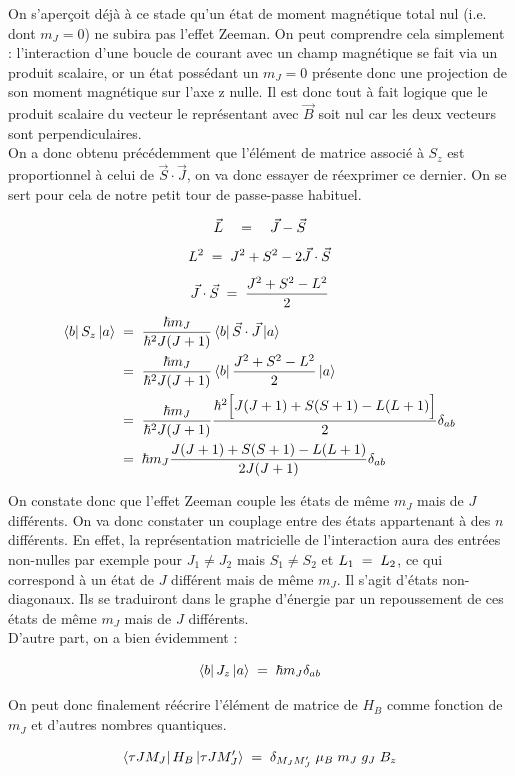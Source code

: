 On s'aperçoit déjà à ce stade qu'un état de moment magnétique total nul (i.e. dont $m_J = 0$) ne subira pas l'effet Zeeman. On peut comprendre cela simplement : l'interaction d'une boucle de courant avec un champ magnétique se fait via un produit scalaire, or un état possédant un  $m_J = 0$ présente donc une projection de son moment magnétique sur l'axe z nulle. Il est donc tout à fait logique que le produit scalaire du vecteur le représentant avec $\vec{B}$ soit nul car les deux vecteurs sont perpendiculaires.\\
On a donc obtenu précédemment que l'élément de matrice associé à $S_z$ est proportionnel à celui de $\vec{S}\cdot\vec{J}$, on va donc essayer de réexprimer ce dernier. On se sert pour cela de notre petit tour de passe-passe habituel.

\[
    \vec{L} \quad = \quad \vec{J} - \vec{S}
\]
\[
    L^2 \; = \; J^2 + S^2 - 2\vec{J}\cdot \vec{S}
\]
\[
    \vec{J}\cdot \vec{S} \; = \; \dfrac{J^2 + S^2 - L^2}{2}
\]
\begin{align*}
    \bra{b}S_z\ket{a}
    &\; = \;
    \dfrac{\hbar m_J}{\hbar^2 J(J+1)} \bra{b}\vec{S}\cdot\vec{J}\ket{a}\\
    &\; = \;
    \dfrac{\hbar m_J}{\hbar^2 J(J+1)} \bra{b}  \dfrac{J^2 + S^2 - L^2}{2}  \ket{a}\\
    &\; = \;
    \dfrac{\hbar m_J}{\hbar^2 J(J+1)} \dfrac{\hbar^2 \Big[J(J+1) + S(S+1) - L(L+1) \Big]}{2}\delta_{ab}\\
    &\; = \;
    \hbar m_J \dfrac{J(J+1) + S(S+1) - L(L+1) }{2J(J+1)} \delta_{ab}
\end{align*}

On constate donc que l'effet Zeeman couple les états de même $m_J$ mais de $J$ différents. On va donc constater un couplage entre des états appartenant à des $n$ différents. En effet, la représentation matricielle de l'interaction aura des entrées non-nulles par exemple pour $J_1\neq J_2$ mais $S_1\neq S_2$ et $L_1 \; = \; L_2$, ce qui correspond à un état de $J$ différent mais de même $m_J$. Il s'agit d'états non-diagonaux. Ils se traduiront dans le graphe d'énergie par un repoussement de ces états de même $m_J$ mais de $J$ différents.\\
D'autre part, on a bien évidemment :

\[
    \bra{b}J_z\ket{a} \; = \; \hbar m_J \delta_{ab}
\]

On peut donc finalement réécrire l'élément de matrice de $H_B$ comme fonction de $m_J$ et d'autres nombres quantiques.

\[
    \bra{\tau J M_J}H_B\ket{\tau J M'_J} \; = \; \delta_{M_J M'_J} \;\mu_B \; m_J \; g_J \; B_z
\]

